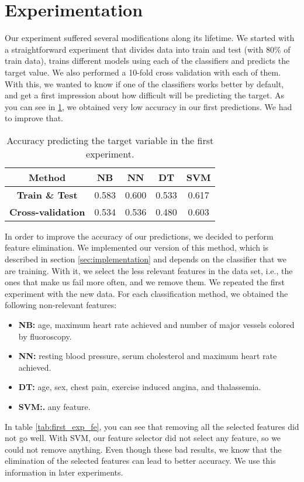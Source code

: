 \section{Experimentation}
\label{sec:experimentation}
Our experiment suffered several modifications along its lifetime. We started with a straightforward experiment that divides data into train and test (with 80\% of train data), trains different models using each of the classifiers and predicts the target value. We also performed a 10-fold cross validation with each of them. With this, we wanted to know if one of the classifiers works better by default, and get a first impression about how difficult will be predicting the target. As you can see in \ref{tab:first_exp}, we obtained very low accuracy in our first predictions. We had to improve that.

\begin{table}[hbtp]
    \centering
    \begin{tabular}{c c c c c}
        \toprule
        \textbf{Method} & \textbf{NB} & \textbf{NN} & \textbf{DT} & \textbf{SVM} \\ \midrule
        \textbf{Train \& Test} & 0.583 & 0.600 & 0.533 & 0.617 \\
        \textbf{Cross-validation} & 0.534 & 0.536 & 0.480 & 0.603 \\
        \bottomrule
    \end{tabular}
    \caption{Accuracy predicting the target variable in the first experiment.}
    \label{tab:first_exp}
\end{table}

In order to improve the accuracy of our predictions, we decided to perform feature elimination. We implemented our version of this method, which is described in section \ref{sec:implementation} and depends on the classifier that we are training. With it, we select the less relevant features in the data set, i.e., the ones that make us fail more often, and we remove them. We repeated the first experiment with the new data. For each classification method, we obtained the following non-relevant features:
\begin{itemize}
    \item \textbf{NB:} age, maximum heart rate achieved and number of major vessels colored by fluoroscopy.
    \item \textbf{NN:} resting blood pressure, serum cholesterol and maximum heart rate achieved.
    \item \textbf{DT:} age, sex, chest pain, exercise induced angina, and thalassemia.
    \item \textbf{SVM:.} any feature.
\end{itemize}
In table \ref{tab:first_exp_fe}, you can see that removing all the selected features did not go well. With SVM, our feature selector did not select any feature, so we could not remove anything. Even though these bad results, we know that the elimination of the selected features can lead to better accuracy. We use this information in later experiments.

